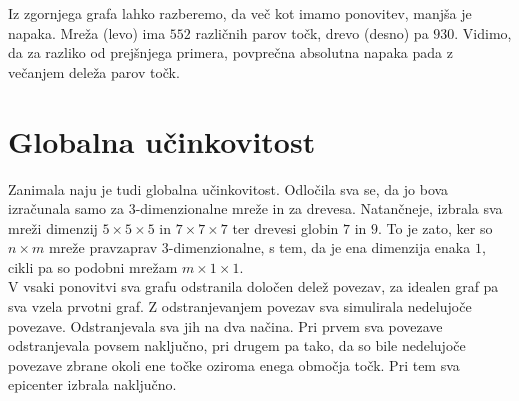 \documentclass[a4paper, 16pt]{article}
\begin{document}
    Iz zgornjega grafa lahko razberemo, da več kot imamo ponovitev, manjša je napaka. Mreža (levo) ima $552$ različnih parov točk, drevo (desno) pa $930$.
    Vidimo, da za razliko od prejšnjega primera, povprečna absolutna napaka pada z večanjem deleža parov točk.

\newpage    


    


\section{Globalna učinkovitost}

Zanimala naju je tudi globalna učinkovitost. Odločila sva se, da jo bova izračunala samo za 3-dimenzionalne mreže in za drevesa. Natančneje, izbrala sva mreži dimenzij $5 \times 5 \times 5$ in $7 \times 7 \times 7$
ter drevesi globin $7$ in $9$.
To je zato, ker so $n \times m$ mreže pravzaprav 3-dimenzionalne, s tem, da je ena dimenzija enaka $1$, cikli pa so podobni mrežam $m \times 1 \times 1$.\\
V vsaki ponovitvi sva grafu odstranila določen delež povezav, za idealen graf pa sva vzela prvotni graf. Z odstranjevanjem povezav sva simulirala nedelujoče povezave. 
Odstranjevala sva jih na dva načina. Pri prvem sva povezave odstranjevala povsem naključno, pri drugem pa tako, da so bile nedelujoče povezave zbrane okoli ene točke oziroma enega območja točk.
Pri tem sva epicenter izbrala naključno. \\
\end{document}
